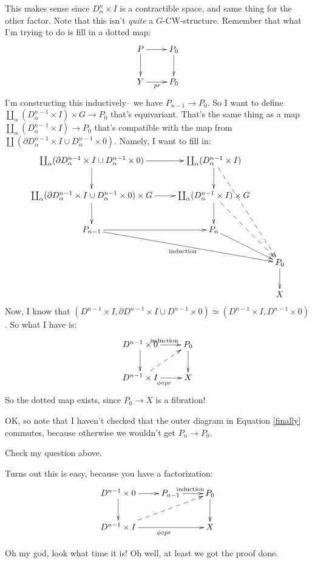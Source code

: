 This makes sense since $D^n_\alpha\times I$ is a contractible space, and same thing for the other factor.
Note that this isn't \emph{quite} a $G$-CW-structure.
Remember that what I'm trying to do is fill in a dotted map:
\begin{equation*}
    \xymatrix{
	P\ar[r]\ar[d] & P_0\ar[d]\\
	Y\ar[r]_{pr} & P_0
    }
\end{equation*}
I'm constructing this inductively-- we have $P_{n-1}\to P_0$. So I want to define $\coprod_\alpha(D^{n-1}_\alpha\times I)\times G\to P_0$ that's equivariant. That's the same thing as a map $\coprod_\alpha (D^{n-1}_\alpha\times I)\to P_0$ that's compatible with the map from $\coprod(\partial D^{n-1}_\alpha\times I\cup D^{n-1}_\alpha\times 0)$. Namely, I want to fill in:
\begin{equation}\label{finally}
    \xymatrix{
	\coprod_\alpha (\partial D^{n-1}_\alpha\times I\cup D^{n-1}_\alpha\times 0)\ar[r]\ar[d] & \coprod_\alpha(D^{n-1}_\alpha\times I)\ar@{-->}[dddr]\ar[d] & \\
	\coprod_\alpha(\partial D^{n-1}_\alpha\times I\cup D^{n-1}_\alpha\times 0)\times G\ar[r]\ar[d] & \coprod_\alpha (D^{n-1}_\alpha\times I)\times G\ar@{-->}[ddr]\ar[d] & \\
	P_{n-1}\ar[drr]_{\mathrm{induction}}\ar[r] & P_n\ar[dr] & \\
	& & P_0\ar[d]\\
	& & X
    }
\end{equation}
Now, I know that $(D^{n-1}\times I,\partial D^{n-1}\times I\cup D^{n-1}\times 0)\simeq (D^{n-1}\times I,D^{n-1}\times 0)$. So what I have is:
\begin{equation*}
    \xymatrix{
	D^{n-1}\times 0\ar[d]\ar[r]^{\mathrm{induction}} & P_0\ar[d]\\
	D^{n-1}\times I\ar[r]_{\phi\circ pr}\ar@{-->}[ur] & X
    }
\end{equation*}
So the dotted map exists, since $P_0\to X$ is a fibration!

OK, so note that I haven't checked that the outer diagram in Equation \ref{finally} commutes, because otherwise we wouldn't get $P_n\to P_0$.
\begin{exercise}
    Check my question above.
    
    Turns out this is easy, because you have a factorization:
\begin{equation*}
    \xymatrix{
	D^{n-1}\times 0\ar[d]\ar[r] & P_{n-1}\ar[r]^{\mathrm{induction}} & P_0\ar[d]\\
	D^{n-1}\times I\ar[rr]_{\phi\circ pr}\ar@{-->}[urr] & & X
    }
\end{equation*}
\end{exercise}
Oh my god, look what time it is! Oh well, at least we got the proof done.
